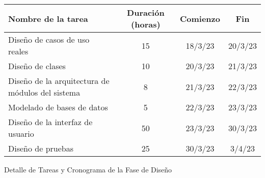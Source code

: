 \begin{planificacion}
	\centering
	\begin{tabular}{ | m{9cm} | c | c | c | }
		\hline
		\textbf{Nombre de la tarea}                      & \textbf{Duración (horas)} & \textbf{Comienzo} & \textbf{Fin} \\\hline
		Diseño de casos de uso reales                    & 15                        & 18/3/23           & 20/3/23      \\\hline
		Diseño de clases                                 & 10                        & 20/3/23           & 21/3/23      \\\hline
		Diseño de la arquitectura de módulos del sistema & 8                         & 21/3/23           & 22/3/23      \\\hline
		Modelado de bases de datos                       & 5                         & 22/3/23           & 23/3/23      \\\hline
		Diseño de la interfaz de usuario                 & 50                        & 23/3/23           & 30/3/23      \\\hline
		Diseño de pruebas                                & 25                        & 30/3/23           & 3/4/23       \\\hline
	\end{tabular}
	\caption{Detalle de Tareas y Cronograma de la Fase de Diseño}
\end{planificacion}
